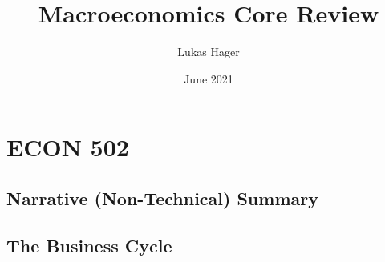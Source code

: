 \documentclass[12pt]{article}
\title{Macroeconomics Core Review}
\author{Lukas Hager}
\date{June 2021}
\begin{document}
\maketitle

\tableofcontents

\section{ECON 502}

\subsection{Narrative (Non-Technical) Summary}

\subsection{The Business Cycle}
\end{document}
